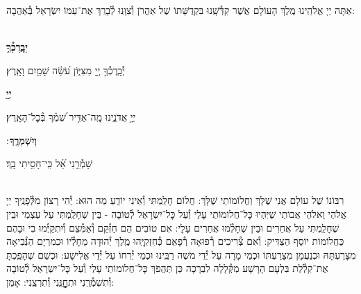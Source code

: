\documentclass[twoside, openany, parskip=half, 11pt]{book}
\begin{document}
אַתָּה יְיָ אֱלֹהֵֽינוּ מֶֽלֶךְ הָעוֹלָם אֲשֶׁר קִדְּ֯שָֽׁנוּ בִּקְדֻשָּׁתוֹ שֶׁל אַהֲרֹן וְ֯צִוָּֽנוּ לְ֯בָרֵךְ אֶת־עַמּוֹ יִשְׂרָאֵל בְּ֯אַהֲבָה:


\\
\textbf{יְבָֽרֶכְ֯ךָ֥}
\hfill \begin{footnotesize}
 יְ֯בָֽרֶכְ֯ךָ֣ יְ֖יָ מִצִּיּ֑וֹן עֹ֝שֵׂ֗ה שָׁמַ֥יִם וָאָֽרֶץ׃\\
\end{footnotesize}
\textbf{יְיָ֖}
\hfill \begin{footnotesize}
 יְיָ֥ אֲדֹנֵ֑ינוּ מָֽה־אַדִּ֥יר שִׁ֝מְ֗ךָ בְּ֯כׇל־הָאָֽרֶץ׃\\
\end{footnotesize}
\textbf{וְיִשְׁמְרֶֽךָ}
׃ \hfill \begin{footnotesize}
 שָׁמְ֯רֵ֥נִי אֵ֝֗ל כִּֽי־חָסִ֥יתִי בָֽךְ׃
\end{footnotesize}

\\

רִבּוֹנוֹ שֶׁל עוֹלָם אֲנִי שֶׁלָּךְ וַחֲלוֹמוֹתַי שֶׁלָּךְ: חֲלוֹם חָלַֽמְתִּי וְ֯אֵינִי יוֹדֵֽעַ מַה הוּא: יְ֯הִי רָצוֹן מִלְּ֯פָנֶֽיךָ יְיָ אֱלֹהַי וֵאלֹהֵי אֲבוֹתַי שֶׁיִּהְיוּ כׇּל־חֲלוֹמוֹתַי עָלַי וְ֯עַל כׇּל־יִשְׂרָאֵל לְ֯טוֹבָה - בֵּין שֶׁחָלַֽמְתִּי עַל עַצְמִי וּבֵין שֶׁחָלַֽמְתִּי עַל אֲחֵרִים וּבֵין שֶׁחָלְ֯מוּ אֲחֵרִים עָלָי: אִם טוֹבִים הֵם חַזְּ֯קֵם וְ֯אַמְּ֯צֵם וְ֯יִתְקַיְּ֯מוּ בִי וּבָהֶם כַּחֲלוֹמוֹת יוֹסֵף הַצַּדִּיק: וְ֯אִם צְ֯רִיכִים רְ֯פוּאָה רְ֯פָאֵם כְּ֯חִזְקִיָּֽהוּ מֶֽלֶךְ יְ֯הוּדָה מֵחָלְ֯יוֹ וּכְמִרְיָם הַנְּ֯בִיאָה מִצָּרַעְתָּהּ וּכְנַעֲמָן מִצָּרַעְתּוֹ וּכְמֵי מָרָה עַל יְ֯דֵי מֹשֶׁה רַבֵּֽינוּ וּכְמֵי יְ֯רִחוֹ עַל יְ֯דֵי אֱלִישָׁע: וּכְשֵׁם שֶׁהָפַֽכְתָּ אֶת־קִלְ֯לַת בִּלְעָם הָרָשָׁע מִקְּ֯לָלָה לִבְרָכָה כֵּן תַּהֲפֹךְ כׇּל־חֲלוֹמוֹתַי עָלַי וְ֯עַל כׇּל־יִשְׂרָאֵל לְ֯טוֹבָה וְ֯תִשְׁמְ֯רֵֽנִי וּתְחׇׇׇׇׇׇׇׇׇׇנֵּֽנִי וְ֯תִרְצֵֽנִי: אָמֵן:
\end{document}
